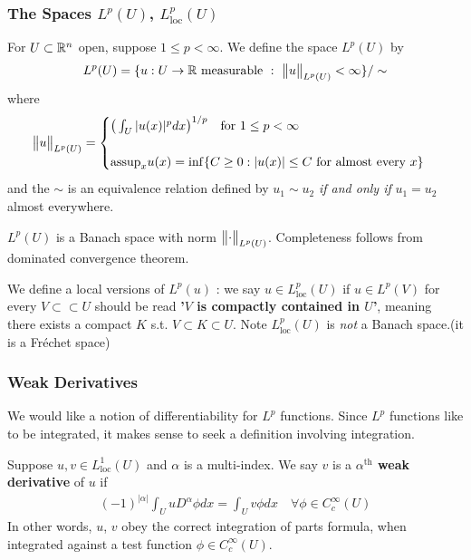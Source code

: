\documentclass[12pt,a4paper]{report}
\begin{document}
\subsubsection*{The Spaces $L^p(U)$, $L^p_{\text{loc}}(U)$}

For $U\subset\mathbb{R}^n$ open, suppose $1\leq p<\infty$. We define the space $L^p(U)$ by
\begin{align*}
L^p(U) = \{ u:U\rightarrow \mathbb{R} \text{ measurable} \,\, : \,\, \bigl\lVert u\bigr\rVert_{L^p(U)} <\infty \} / \sim
\end{align*}
where
\begin{align*}
\bigl\lVert u\bigr\rVert_{L^p(U)} = \begin{cases}
\big( \int_{U} |u(x)|^p dx \big)^{1/p} \quad \text{for } 1\leq p <\infty \\
\\
\text{assup}_x u(x) = \inf \{C\geq 0 : |u(x)| \leq C \text{ for almost every } x \}
\end{cases}
\end{align*}
and the $\sim$ is an equivalence relation defined by $u_1 \sim u_2$ \emph{if and only if} $u_1 = u_2$ almost everywhere.

$L^p(U)$ is a Banach space with norm $\bigl\lVert\cdot\bigr\rVert_{L^p(U)}$. Completeness follows from dominated convergence theorem.
\s

We define a local versions of $L^p(u)$ : we say $u\in L^p_{\text{loc}}(U)$ if $u\in L^p(V)$ for every $V \subset\subset U$ should be read \textbf{'$V$ is compactly contained in $U$'}, meaning there exists a compact $K$ s.t. $V\subset K \subset U$. Note $L^p_{\text{loc}}(U)$ is \emph{not} a Banach space.(it is a Fr\'{e}chet space)

\subsubsection*{Weak Derivatives}

We would like a notion of differentiability for $L^p$ functions. Since $L^p$ functions like to be integrated, it makes sense to seek a definition involving integration.
\s

 Suppose $u,v\in L^1_{\text{loc}}(U)$ and $\alpha$ is a multi-index. We say $v$ is a \textbf{$\alpha^{\text{th}}$ weak derivative} of $u$ if
\begin{align*}
(-1)^{|\alpha|} \int_{U} uD^{\alpha} \phi dx = \int_U v\phi dx \quad \forall \phi \in C^{\infty}_c(U)
\end{align*}
In other words, $u$, $v$ obey the correct integration of parts formula, when integrated against a test function $\phi \in C^{\infty}_c(U)$.
\s
\end{document}
